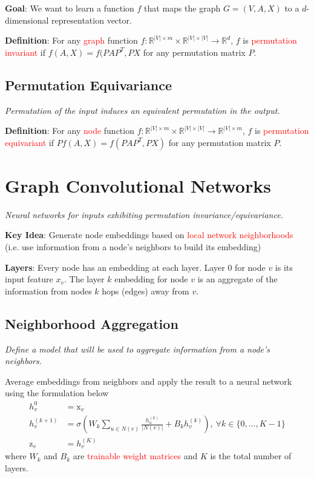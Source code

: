 \documentclass[12pt]{article}
\newcommand{\tbf}{\textbf}
\newcommand{\tit}{\textit}
\newcommand{\tcR}{\textcolor{red}}
\newcommand{\mbb}{\mathbb}
\newcommand{\mrm}{\mathrm}
\begin{document}
\medskip
\tbf{Goal}: We want to learn a function $f$ that maps the graph
$G=(V,A,X)$ to a $d$-dimensional representation vector.

\medskip
\tbf{Definition}: For any \tcR{graph} function $f: \mbb{R}^{|V| \times m} \times
\mbb{R}^{|V| \times |V|} \rightarrow \mbb{R}^d$, $f$ is
\tcR{permutation invariant} if $f(A,X) = f(PAP^T, PX$ for any permutation matrix
$P$.

\subsection*{Permutation Equivariance}

\tit{Permutation of the input induces an equivalent permutation in the output.}

\medskip
\tbf{Definition}: For any \tcR{node} function $f: \mbb{R}^{|V| \times m} \times
\mbb{R}^{|V| \times |V|} \rightarrow \mbb{R}^{|V| \times m}$, $f$ is
\tcR{permutation equivariant} if $Pf(A,X) = f(PAP^T,PX)$ for any permutation
matrix $P$.

\section*{Graph Convolutional Networks}

\tit{Neural networks for inputs exhibiting permutation invariance/equivariance.}

\medskip
\tbf{Key Idea}: Generate node embeddings based on \tcR{local network
neighborhoods} (i.e. use information from a node's neighbors to build its
embedding)

\medskip
\tbf{Layers}: Every node has an embedding at each layer. Layer 0 for node $v$ is
its input feature $x_v$. The layer $k$ embedding for node $v$ is an aggregate of
the information from nodes $k$ hops (edges) away from $v$.

\subsection*{Neighborhood Aggregation}

\tit{Define a model that will be used to aggregate information from a node's
neighbors.}

\medskip
Average embeddings from neighbors and apply the result to a neural network using
the formulation below
\begin{align*}
  h^0_v &= \mrm{x}_v \\
  h^{(k+1)}_v &= \sigma\left(W_k \sum_{u \in N(v)} \frac{h^{(k)}_u}{|N(v)|} + B_k
  h^{(k)}_v\right),\ \forall k \in \{0,\hdots,K-1\} \\
  \mrm{z}_v &= h^{(K)}_v
\end{align*}
where $W_k$ and $B_k$ are \tcR{trainable weight matrices} and $K$ is the total
number of layers.
\end{document}
